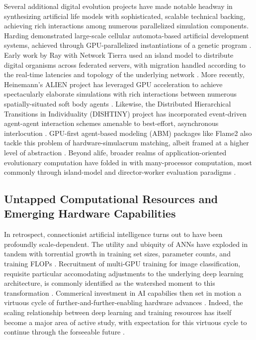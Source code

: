 Several additional digital evolution projects have made notable headway in synthesizing artificial life models with sophisticated, scalable technical backing, achieving rich interactions among numerous parallelized simulation components.
Harding demonstrated large-scale cellular automota-based artificial development systems, achieved through GPU-parallelized instantiations of a genetic program  \citep{harding2007fast_ieee}.
Early work by Ray with Network Tierra used an island model to distribute digital organisms across federated servers, with migration handled according to the real-time latencies and topology of the underlying network \citep{ray1995proposal}.
More recently, Heinemann's ALIEN project has leveraged GPU acceleration to achieve spectacularly elaborate simulations with rich interactions between numerous spatially-situated soft body agents \citep{heinemann2008artificial}.
Likewise, the Distributed Hierarchical Transitions in Individuality (DISHTINY) project has incorporated event-driven agent-agent interaction schemes amenable to best-effort, asynchronous interlocution \citep{TODO,TODOconduit}.
GPU-first agent-based modeling (ABM) packages like Flame2 also tackle this problem of hardware-simulacrum matching, albeit framed at a higher level of abstraction \citep{TODO}.
Beyond alife, broader realms of application-oriented evolutionary computation have folded in with many-processor computation, most commonly through island-model and director-worker evaluation paradigms \citep{TODO}.

\subsection{Untapped Computational Resources and Emerging Hardware Capabilities}

In retrospect, connectionist artificial intelligence turns out to have been profoundly scale-dependent.
The utility and ubiquity of ANNs have exploded in tandem with torrential growth in training set sizes, parameter counts, and training FLOPs \citep{marcus2018deep}.
Recruitment of multi-GPU training for image classification, requisite particular accomodating adjustments to the underlying deep learning architecture, is commonly identified as the watershed moment to this transformation
 \citep{krizhevsky2012imagenet}.
Commerical investment in AI capabilies then set in motion a virtuous cycle of further-and-further-enabling hardware advances \citep{jouppi2017datacenter}.
Indeed, the scaling relationship between deep learning and training resources has itself become a major area of active study, with expectation for this virtuous cycle to continue through the forseeable future \citep{CITETODOTHATGOOGLEPAPERPREPRINTSCALEISALLYOUNEED}.

